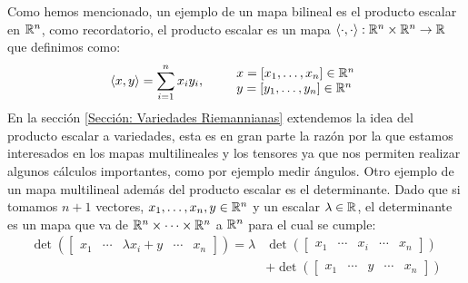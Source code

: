 Como hemos mencionado, un ejemplo de un mapa bilineal es el producto escalar en $\mathbb{R}^n$, como recordatorio, el producto escalar es un mapa $\langle \cdot , \cdot \rangle: \mathbb{R}^n \times \mathbb{R}^n \to \mathbb{R}$ que definimos como:
\[
	\langle x,y \rangle = \sum_{i=1}^{n} x_i y_i, \quad\quad
	\begin{array}{l}
		x=[x_1,\dots,x_n] \in \mathbb{R}^n \\
		y=[y_1,\dots,y_n] \in \mathbb{R}^n
	\end{array}
\]
En la sección \ref{Sección: Variedades Riemannianas} extendemos la idea del producto escalar a variedades, esta es en gran parte la razón por la que estamos interesados en los mapas multilineales y los tensores ya que nos permiten realizar algunos cálculos importantes, como por ejemplo medir ángulos.
Otro ejemplo de un mapa multilineal además del producto escalar es el determinante. Dado que si tomamos $n+1$ vectores, $x_1, \ldots, x_n, y \in \mathbb{R}^n$ y un escalar $\lambda \in \mathbb{R}$, el determinante es un mapa que va de $\mathbb{R}^n \times \cdots \times \mathbb{R}^n$ a $\mathbb{R}^n$ para el cual se cumple:
\begin{align*}
	\det(\begin{bmatrix}x_1 & \cdots & \lambda x_i + y & \cdots & x_n \end{bmatrix}) = \lambda &
	\det(\begin{bmatrix}x_1 & \cdots &x_i&\cdots& x_n \end{bmatrix})                                                                                                  \\
	                                                                                           & + \det(\begin{bmatrix}x_1 & \cdots & y & \cdots & x_n \end{bmatrix})
\end{align*}
